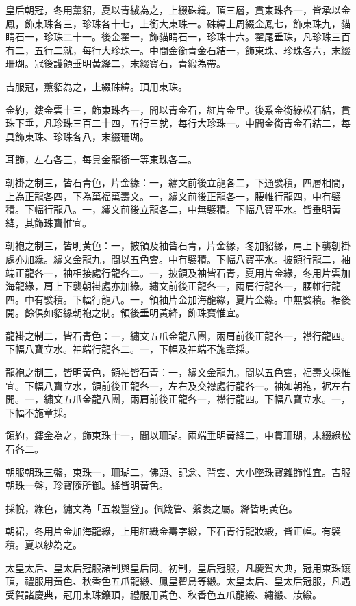 \begin{pinyinscope}
皇后朝冠，冬用薰貂，夏以青絨為之，上綴硃緯。頂三層，貫東珠各一，皆承以金鳳，飾東珠各三，珍珠各十七，上銜大東珠一。硃緯上周綴金鳳七，飾東珠九，貓睛石一，珍珠二十一。後金翟一，飾貓睛石一，珍珠十六。翟尾垂珠，凡珍珠三百有二，五行二就，每行大珍珠一。中間金銜青金石結一，飾東珠、珍珠各六，末綴珊瑚。冠後護領垂明黃絳二，末綴寶石，青緞為帶。

吉服冠，薰貂為之，上綴硃緯。頂用東珠。

金約，鏤金雲十三，飾東珠各一，間以青金石，紅片金里。後系金銜綠松石結，貫珠下垂，凡珍珠三百二十四，五行三就，每行大珍珠一。中間金銜青金石結二，每具飾東珠、珍珠各八，末綴珊瑚。

耳飾，左右各三，每具金龍銜一等東珠各二。

朝褂之制三，皆石青色，片金緣：一，繡文前後立龍各二，下通襞積，四層相間，上為正龍各四，下為萬福萬壽文。一，繡文前後正龍各一，腰帷行龍四，中有襞積。下幅行龍八。一，繡文前後立龍各二，中無襞積。下幅八寶平水。皆垂明黃絳，其飾珠寶惟宜。

朝袍之制三，皆明黃色：一，披領及袖皆石青，片金緣，冬加貂緣，肩上下襲朝褂處亦加緣。繡文金龍九，間以五色雲。中有襞積。下幅八寶平水。披領行龍二，袖端正龍各一，袖相接處行龍各二。一，披領及袖皆石青，夏用片金緣，冬用片雲加海龍緣，肩上下襲朝褂處亦加緣。繡文前後正龍各一，兩肩行龍各一，腰帷行龍四。中有襞積。下幅行龍八。一，領袖片金加海龍緣，夏片金緣。中無襞積。裾後開。餘俱如貂緣朝袍之制。領後垂明黃絳，飾珠寶惟宜。

龍褂之制二，皆石青色：一，繡文五爪金龍八團，兩肩前後正龍各一，襟行龍四。下幅八寶立水。袖端行龍各二。一，下幅及袖端不施章採。

龍袍之制三，皆明黃色，領袖皆石青：一，繡文金龍九，間以五色雲，福壽文採惟宜。下幅八寶立水，領前後正龍各一，左右及交襟處行龍各一。袖如朝袍，裾左右開。一，繡文五爪金龍八團，兩肩前後正龍各一，襟行龍四。下幅八寶立水。一，下幅不施章採。

領約，鏤金為之，飾東珠十一，間以珊瑚。兩端垂明黃絳二，中貫珊瑚，末綴綠松石各二。

朝服朝珠三盤，東珠一，珊瑚二，佛頭、記念、背雲、大小墜珠寶雜飾惟宜。吉服朝珠一盤，珍寶隨所御。絳皆明黃色。

採帨，綠色，繡文為「五穀豐登」。佩箴管、縏袠之屬。絳皆明黃色。

朝裙，冬用片金加海龍緣，上用紅織金壽字緞，下石青行龍妝緞，皆正幅。有襞積。夏以紗為之。

太皇太后、皇太后冠服諸制與皇后同。初制，皇后冠服，凡慶賀大典，冠用東珠鑲頂，禮服用黃色、秋香色五爪龍緞、鳳皇翟鳥等緞。太皇太后、皇太后冠服，凡遇受賀諸慶典，冠用東珠鑲頂，禮服用黃色、秋香色五爪龍緞、繡緞、妝緞。


\end{pinyinscope}
